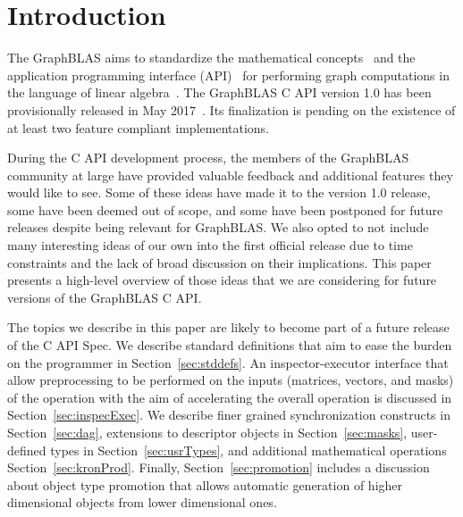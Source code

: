 %
%
\section{Introduction}
\label{sec:intro}

The GraphBLAS aims to standardize the mathematical
concepts~\cite{mathgraphblas16} and the application programming interface
(API)~\cite{graphblas_capi_17} for performing graph computations
in the language of linear algebra~\cite{kepner2011graph}. The
GraphBLAS C API version 1.0 has been provisionally released in May
2017~\cite{graphblasapi}. Its finalization is pending on the existence
of at least two feature compliant implementations.

During the C API development process, the members of the GraphBLAS
community at large have provided valuable feedback and additional features
they would like to see. Some of these ideas have made it to the version
1.0 release, some have been deemed out of scope, and some have been
postponed for future releases despite being relevant for GraphBLAS. We
also opted to not include many interesting ideas of our own into the first
official release due to time constraints and the lack of broad discussion
on their implications. This paper presents a high-level overview of those
ideas that we are considering for future versions of the GraphBLAS C API.

The topics we describe in this paper are likely to become part of a
future release of the C API Spec. We describe standard definitions that
aim to ease the burden on the programmer in Section~\ref{sec:stddefs}.
An inspector-executor interface that allow preprocessing to be
performed on the inputs (matrices, vectors, and masks) of the
operation with the aim of accelerating the overall operation is discussed
in Section~\ref{sec:inspecExec}.
We describe finer grained
synchronization constructs in Section~\ref{sec:dag}, extensions to
descriptor objects in Section~\ref{sec:masks}, user-defined types in
Section~\ref{sec:usrTypes}, and additional mathematical operations
Section~\ref{sec:kronProd}. Finally, Section~\ref{sec:promotion} includes a discussion about
object type promotion that allows automatic generation of higher
dimensional objects from lower dimensional ones.
